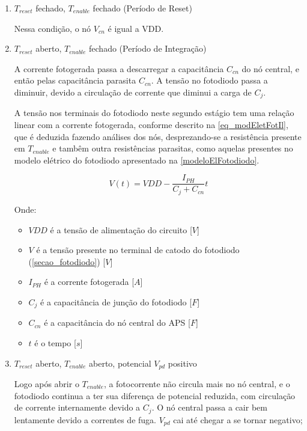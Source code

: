 \begin{enumerate}

\item \emph{$T_{reset}$} fechado, \emph{$T_{enable}$} fechado (Período de Reset)
    
Nessa condição, o n\'o $V_{cn}$ \'e igual a VDD.

\item \emph{$T_{reset}$} aberto, \emph{$T_{enable}$} fechado (Período de Integração)

A corrente fotogerada passa a descarregar a capacit\^ancia $C_{cn}$ do nó central, e então pelas capacitância parasita \emph{$C_{cn}$}. A tensão no fotodiodo passa a diminuir, devido a circulação de corrente que diminui a carga de \emph{$C_{j}$}.

A tens\~ao nos terminais do fotodiodo neste segundo est\'agio tem uma rela{\c c}\~ao linear com a corrente fotogerada, conforme descrito na \autoref{eq_modEletFotIl}, que \'e deduzida fazendo an\'alises dos n\'os, desprezando-se a resistência presente em $T_{enable}$ e tamb\^em outra resistências parasitas, como aquelas presentes no modelo elétrico do fotodiodo apresentado na \autoref{modeloElFotodiodo}.

\begin{equation}
    \label{eq_modEletFotIl}
    V(t) = VDD-\frac{I_{PH}}{C_j+C_{cn}}t
\end{equation}

Onde:

\begin{itemize}
    \item $VDD$ \'e a tens\~ao de alimenta{\c c}\~ao do circuito [$V$]
    \item $V$ \'e a tens\~ao presente no terminal de catodo do fotodiodo (\autoref{secao_fotodiodo}) [$V$]
    \item $I_{PH}$ \'e a corrente fotogerada [$A$]
    \item $C_j$ \'e a capacit\^ancia de jun{\c c}\~ao do fotodiodo [$F$]
    \item $C_{cn}$ \'e a capacit\^ancia do n\'o central do APS [$F$]
    \item $t$ \'e o tempo [$s$]
\end{itemize}

\item \emph{$T_{reset}$} aberto, \emph{$T_{enable}$} aberto, potencial \emph{$V_{pd}$} positivo

Logo ap\'os abrir o $T_{enable}$, a fotocorrente n\~ao circula mais no n\'o central, e o fotodiodo continua a ter sua diferen{\c c}a de potencial reduzida, com circula{\c c}\~ao de corrente internamente devido a \emph{$C_j$}. O n\'o central passa a cair bem lentamente devido a correntes de fuga. \emph{$V_{pd}$} cai at\'e chegar a se tornar negativo;


\end{enumerate}
